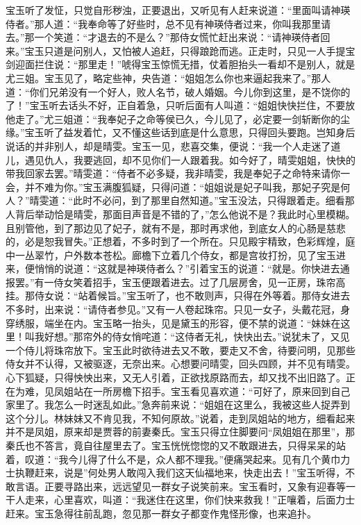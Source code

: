 \begin{parag}
    宝玉听了发怔，只觉自形秽浊，正要退出，又听见有人赶来说道：“里面叫请神瑛侍者。”那人道：“我奉命等了好些时，总不见有神瑛侍者过来，你叫我那里请去。”那一个笑道：“才退去的不是么？”那侍女慌忙赶出来说：“请神瑛侍者回来。”宝玉只道是问别人，又怕被人追赶，只得踉跄而逃。正走时，只见一人手提宝剑迎面拦住说：“那里走！”唬得宝玉惊慌无措，仗着胆抬头一看却不是别人，就是尤三姐。宝玉见了，略定些神，央告道：“姐姐怎么你也来逼起我来了。”那人道：“你们兄弟没有一个好人，败人名节，破人婚姻。今儿你到这里，是不饶你的了！”宝玉听去话头不好，正自着急，只听后面有人叫道：“姐姐快快拦住，不要放他走了。”尤三姐道：“我奉妃子之命等侯已久，今儿见了，必定要一剑斩断你的尘缘。”宝玉听了益发着忙，又不懂这些话到底是什么意思，只得回头要跑。岂知身后说话的并非别人，却是晴雯。宝玉一见，悲喜交集，便说：“我一个人走迷了道儿，遇见仇人，我要逃回，却不见你们一人跟着我。如今好了，晴雯姐姐，快快的带我回家去罢。”晴雯道：“侍者不必多疑，我非晴雯，我是奉妃子之命特来请你一会，并不难为你。”宝玉满腹狐疑，只得问道：“姐姐说是妃子叫我，那妃子究是何人？”晴雯道：“此时不必问，到了那里自然知道。”宝玉没法，只得跟着走。细看那人背后举动恰是晴雯，那面目声音是不错的了，”怎么他说不是？我此时心里模糊。且别管他，到了那边见了妃子，就有不是，那时再求他，到底女人的心肠是慈悲的，必是恕我冒失。”正想着，不多时到了一个所在。只见殿宇精致，色彩辉煌，庭中一丛翠竹，户外数本苍松。廊檐下立着几个侍女，都是宫妆打扮，见了宝玉进来，便悄悄的说道：“这就是神瑛侍者么？”引着宝玉的说道：“就是。你快进去通报罢。”有一侍女笑着招手，宝玉便跟着进去。过了几层房舍，见一正房，珠帘高挂。那侍女说：“站着候旨。”宝玉听了，也不敢则声，只得在外等着。那侍女进去不多时，出来说：“请侍者参见。”又有一人卷起珠帘。只见一女子，头戴花冠，身穿绣服，端坐在内。宝玉略一抬头，见是黛玉的形容，便不禁的说道：“妹妹在这里！叫我好想。”那帘外的侍女悄咤道：“这侍者无礼，快快出去。”说犹未了，又见一个侍儿将珠帘放下。宝玉此时欲待进去又不敢，要走又不舍，待要问明，见那些侍女并不认得，又被驱逐，无奈出来。心想要问晴雯，回头四顾，并不见有晴雯。心下狐疑，只得怏怏出来，又无人引着，正欲找原路而去，却又找不出旧路了。正在为难，见凤姐站在一所房檐下招手。宝玉看见喜欢道：“可好了，原来回到自己家里了。我怎么一时迷乱如此。”急奔前来说：“姐姐在这里么，我被这些人捉弄到这个分儿。林妹妹又不肯见我，不知何原故。”说着，走到凤姐站的地方，细看起来并不是凤姐，原来却是贾蓉的前妻秦氏。宝玉只得立住脚要问“凤姐姐在那里”，那秦氏也不答言，竟自往屋里去了。宝玉恍恍惚惚的又不敢跟进去，只得呆呆的站着，叹道：“我今儿得了什么不是，众人都不理我。”便痛哭起来。见有几个黄巾力士执鞭赶来，说是”何处男人敢闯入我们这天仙福地来，快走出去！”宝玉听得，不敢言语。正要寻路出来，远远望见一群女子说笑前来。宝玉看时，又象有迎春等一干人走来，心里喜欢，叫道：“我迷住在这里，你们快来救我！”正嚷着，后面力士赶来。宝玉急得往前乱跑，忽见那一群女子都变作鬼怪形像，也来追扑。
\end{parag}


